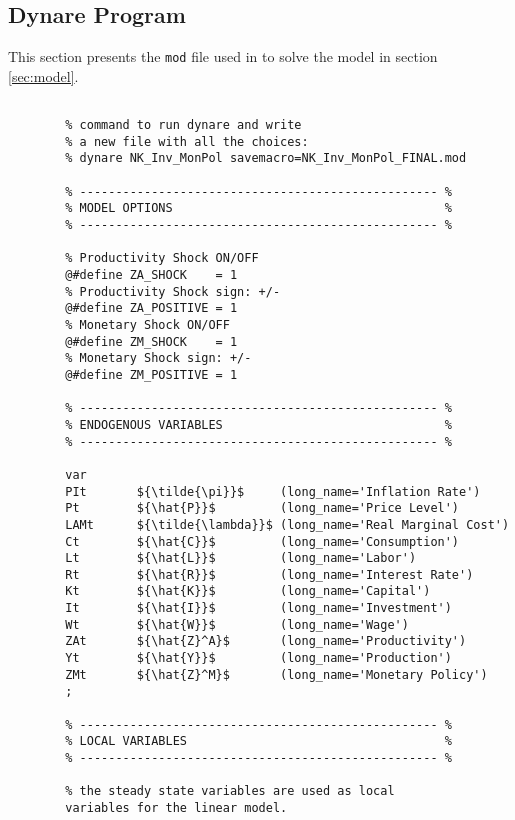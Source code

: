 \documentclass[
thesis.tex
]{subfiles}
\begin{document}
\newpage

\subsection{Dynare Program}

This section presents the \texttt{mod} file used in \dynare to solve the model in section \ref{sec:model}.

\vspace*{-0.5cm}

{\singlespacing
	
	\begin{verbatim} 
		
		% command to run dynare and write
		% a new file with all the choices:
		% dynare NK_Inv_MonPol savemacro=NK_Inv_MonPol_FINAL.mod
		
		% -------------------------------------------------- %
		% MODEL OPTIONS                                      %
		% -------------------------------------------------- %
		
		% Productivity Shock ON/OFF
		@#define ZA_SHOCK    = 1
		% Productivity Shock sign: +/-
		@#define ZA_POSITIVE = 1
		% Monetary Shock ON/OFF
		@#define ZM_SHOCK    = 1
		% Monetary Shock sign: +/-
		@#define ZM_POSITIVE = 1
		
		% -------------------------------------------------- %
		% ENDOGENOUS VARIABLES                               %
		% -------------------------------------------------- %
		
		var
		PIt       ${\tilde{\pi}}$     (long_name='Inflation Rate')
		Pt        ${\hat{P}}$         (long_name='Price Level')
		LAMt      ${\tilde{\lambda}}$ (long_name='Real Marginal Cost')
		Ct        ${\hat{C}}$         (long_name='Consumption')
		Lt        ${\hat{L}}$         (long_name='Labor')
		Rt        ${\hat{R}}$         (long_name='Interest Rate')
		Kt        ${\hat{K}}$         (long_name='Capital')
		It        ${\hat{I}}$         (long_name='Investment')
		Wt        ${\hat{W}}$         (long_name='Wage')
		ZAt       ${\hat{Z}^A}$       (long_name='Productivity')
		Yt        ${\hat{Y}}$         (long_name='Production')
		ZMt       ${\hat{Z}^M}$       (long_name='Monetary Policy')
		;
		
		% -------------------------------------------------- %
		% LOCAL VARIABLES                                    %
		% -------------------------------------------------- %
		
		% the steady state variables are used as local 
		variables for the linear model.
		

\end{verbatim}}
\end{document}
